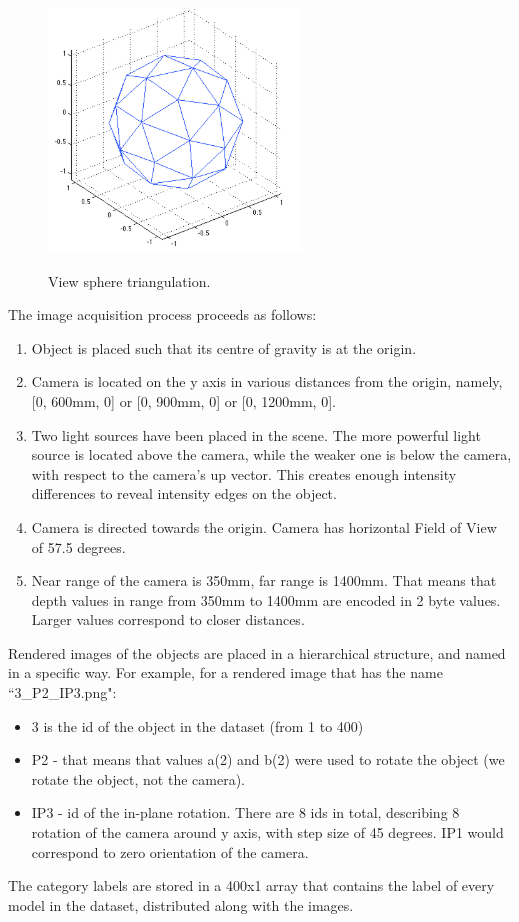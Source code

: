 \documentclass[12pt]{article}
\begin{document}
\begin{figure}[!h]
  \caption{View sphere triangulation.}
  \centering
    \includegraphics[width=0.6\textwidth]{viewSphere.png}
\label{viewSphere}
\end{figure}

The image acquisition process proceeds as follows:
\begin{enumerate}
\item Object is placed such that its centre of gravity is at the origin.
\item Camera is located on the y axis in various distances from the origin, namely, [0, 600mm, 0] or [0, 900mm, 0] or [0, 1200mm, 0].
\item Two light sources have been placed in the scene. The more powerful light source is located above the camera, while the weaker one is below the camera, with respect to the camera's up vector. This creates enough intensity differences to reveal intensity edges on the object. 
\item Camera is directed towards the origin. Camera has horizontal Field of View of 57.5 degrees.
\item Near range of the camera is 350mm, far range is 1400mm. That means that depth values in range from 350mm to 1400mm are encoded in 2 byte values. Larger values correspond to closer distances.
\end{enumerate}

Rendered images of the objects are placed in a hierarchical structure, and named in a specific way. For example, for a rendered image that has the name ``3\_P2\_IP3.png":
\begin{itemize}
\item 3 is the id of the object in the dataset (from 1 to 400)
\item P2 - that means that values a(2) and b(2) were used to rotate the object (we rotate the object, not the camera).
\item IP3 - id of the in-plane rotation. There are 8 ids in total, describing 8 rotation of the camera around y axis, with step size of 45 degrees. IP1 would correspond to zero orientation of the camera.
\end{itemize}

The category labels are stored in a 400x1 array that contains the label of every model in the dataset, distributed along with the images.



\end{document}
